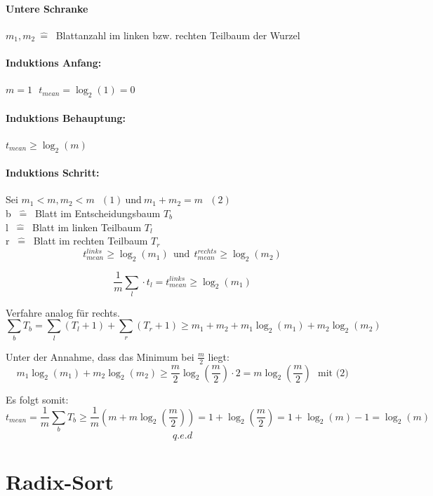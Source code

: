 \vspace{30pt}
\paragraph{Untere Schranke}
$m_1, m_2 ~\hat{=}~$ Blattanzahl im linken bzw. rechten Teilbaum der Wurzel
\vspace{100pt}

\paragraph{Induktions Anfang:} $m=1 ~~~ t_{mean} = \log_2(1)=0$

\paragraph{Induktions Behauptung:} $t_{mean} \geq \log_2(m)$

\paragraph{Induktions Schritt:} Sei $m_1 < m, m_2 < m ~~~(1) ~\text{und}~ m_1+m_2=m ~~~(2)$ \\

b $~\hat{=}~$ Blatt im Entscheidungsbaum $T_b$\\
l $~\hat{=}~$ Blatt im linken Teilbaum $T_l$\\
r $~\hat{=}~$ Blatt im rechten Teilbaum $T_r$\\

\[t^{links}_{mean} \geq \log_2(m_1) ~~\text{und}~~t^{rechts}_{mean} \geq \log_2(m_2)\]

\[\frac{1}{m} \sum_{l} \cdot t_l = t^{links}_{mean}  \geq \log_2(m_1) \]

Verfahre analog für rechts.\\

\[\sum_b T_b = \sum_l (T_l+1) + \sum_r (T_r+1) \geq m_1+m_2 + m_1 \log_2(m_1) + m_2 \log_2(m_2) \]

Unter der Annahme, dass das Minimum bei $\frac{m}{2}$ liegt:
\[m_1 \log_2(m_1) + m_2 \log_2(m_2) \geq \frac{m}{2} \log_2(\frac{m}{2}) \cdot 2 = m \log_2(\frac{m}{2}) ~~~\text{mit (2)} \] 

Es folgt somit: 
\[ t_{mean} = \frac{1}{m} \sum_b T_b \geq  \frac{1}{m}(m+m\log_2( \frac{m}{2})) = 1+ \log_2( \frac{m}{2}) = 1+ \log_2(m) -1 = \log_2(m) \]
\[q.e.d\]

\newpage


\section{Radix-Sort}

